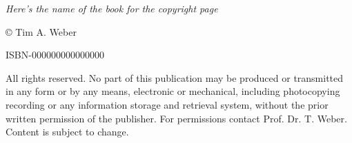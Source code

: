 \null\vfill
\begin{flushleft}
\thispagestyle{empty}
\textit{Here's the name of the book for the copyright page}

© Tim A. Weber

ISBN-000000000000000

\noindent All rights reserved. No part of this publication may be produced or transmitted in any form or by any means, electronic or mechanical, including photocopying recording or any information storage and retrieval system, without the prior written permission of the publisher. For permissions contact Prof. Dr. T. Weber. Content is subject to change.
\end{flushleft}
